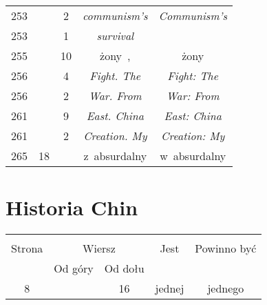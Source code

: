 \documentclass[a4paper,11pt]{article}
\begin{document}
\begin{center}
\begin{tabular}{|c|c|c|c|c|}
    253 & &  2 & \emph{communism's} & \emph{Communism's} \\
    253 & &  1 & \emph{survival} & \\
    255 & & 10 & żony~, & żony \\
    256 & &  4 & \emph{Fight. The} & \emph{Fight: The} \\
    256 & &  2 & \emph{War. From} & \emph{War: From} \\
    261 & &  9 & \emph{East. China} & \emph{East: China} \\
    261 & &  2 & \emph{Creation. My} & \emph{Creation: My} \\
    265 & 18 & & z~absurdalny & w~absurdalny \\
    \hline
  \end{tabular}
\end{center}






\newpage
\section{Historia Chin}

\vspace{\spaceTwo}







\begin{center}
  \begin{tabular}{|c|c|c|c|c|}
    \hline
    & \multicolumn{2}{c|}{} & & \\
    Strona & \multicolumn{2}{c|}{Wiersz} & Jest
                              & Powinno być \\ \cline{2-3}
    & Od góry & Od dołu & & \\
    \hline
    8   & & 16 & jednej & jednego \\
    \hline
  \end{tabular}
\end{center}
\end{document}
